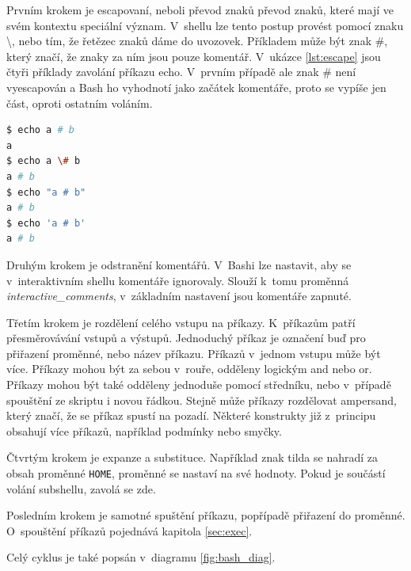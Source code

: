 \documentclass[thesis=M,czech]{FITthesis}[2012/06/26]
\begin{document}
Prvním krokem je escapovaní, neboli převod znaků převod znaků, které mají ve svém kontextu speciální význam. V~shellu lze tento postup provést pomocí znaku \textbackslash, nebo tím, že řetězec znaků dáme do uvozovek. Příkladem může být znak \#, který značí, že znaky za ním jsou pouze komentář. V~ukázce \ref{lst:escape} jsou čtyři příklady zavolání příkazu echo. V~prvním případě ale znak \# není vyescapován a Bash ho vyhodnotí jako začátek komentáře, proto se vypíše jen část, oproti ostatním voláním.

\noindent
\begin{minipage}{\linewidth}
\begin{lstlisting}[language=bash, caption={Escapovaní v~shellu}, label={lst:escape}]
$ echo a # b
a
$ echo a \# b
a # b
$ echo "a # b"
a # b
$ echo 'a # b'
a # b
\end{lstlisting}
\end{minipage}

Druhým krokem je odstranění komentářů. V~Bashi lze nastavit, aby se v~interaktivním shellu komentáře ignorovaly. Slouží k~tomu proměnná \textit{interactive\_comments}, v~základním nastavení jsou komentáře zapnuté.

Třetím krokem je rozdělení celého vstupu na příkazy. K~příkazům patří přesměrovávání vstupů a výstupů. Jednoduchý příkaz je označení buď pro přiřazení proměnné, nebo název příkazu. Příkazů v~jednom vstupu může být více. Příkazy mohou být za sebou v~rouře, odděleny logickým and nebo or. Příkazy mohou být také odděleny jednoduše pomocí středníku, nebo v~případě spouštění ze skriptu i novou řádkou. Stejně může příkazy rozdělovat ampersand, který značí,  že se příkaz spustí na pozadí. Některé konstrukty již z~principu obsahují více příkazů, například podmínky nebo smyčky.

Čtvrtým krokem je expanze a substituce. Například znak tilda se nahradí za obsah proměnné \texttt{HOME}, proměnné se nastaví na své hodnoty. Pokud je součástí volání subshellu, zavolá se zde.

Posledním  krokem je samotné spuštění příkazu, popřípadě přiřazení do proměnné. O~spouštění příkazů pojednává kapitola \ref{sec:exec}.

Celý cyklus je také popsán v~diagramu \ref{fig:bash_diag}.
\end{document}
